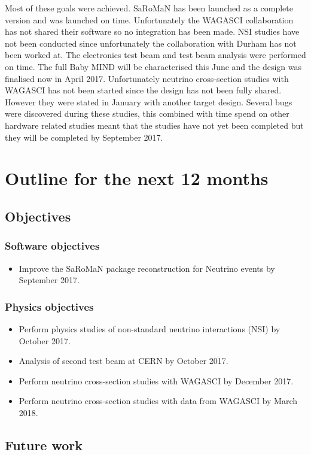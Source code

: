 Most of these goals were achieved. SaRoMaN has been launched as a complete version and was launched on time. Unfortunately the WAGASCI collaboration has not shared their software so no integration has been made. NSI studies have not been conducted since unfortunately the collaboration with Durham has not been worked at. The electronics test beam and test beam analysis were performed on time. The full Baby MIND will be characterised this June and the design was finalised now in April 2017. Unfortunately neutrino cross-section studies with WAGASCI has not been started since the design has not been fully shared. However they were stated in January with another target design. Several bugs were discovered during these studies, this combined with time spend on other hardware related studies meant that the studies have not yet been completed but they will be completed by September 2017.

\chapter{Outline for the next 12 months}
\section{Objectives}
\label{a:objectives}
\subsection{Software objectives}
\begin{itemize}
\item Improve the SaRoMaN package reconstruction for Neutrino events by September 2017.
\end{itemize}
\subsection{Physics objectives}
\begin{itemize}
\item Perform physics studies of non-standard neutrino interactions (NSI) by October 2017.
\item Analysis of second test beam at CERN by October 2017.
\item Perform neutrino cross-section studies with WAGASCI by December 2017.
\item Perform neutrino cross-section studies with data from WAGASCI by March 2018.
\end{itemize}

\section{Future work}
